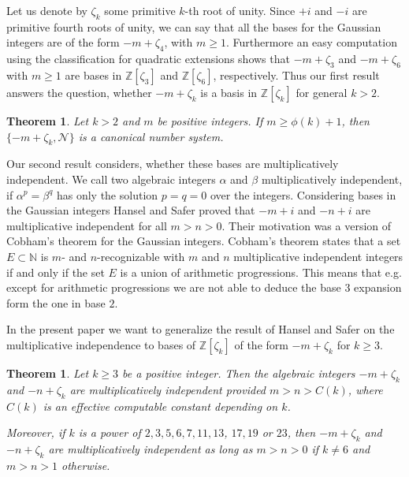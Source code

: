 \documentclass{amsart}
\theoremstyle{plain}
\numberwithin{equation}{section}
\newtheorem{theorem}[thm]{Theorem}
\theoremstyle{remark}
\begin{document}
Let us denote by $\zeta_k$ some primitive $k$-th root of unity. Since
$+i$ and $-i$ are primitive fourth roots of unity, we can say that all
the bases for the Gaussian integers are of the form $-m+\zeta_4$, with
$m\geq 1$. Furthermore an easy computation using the classification
for quadratic extensions shows that $-m+\zeta_3$ and $-m+\zeta_6$ with
$m\geq1$ are bases in ${{\mathbb Z}}[\zeta_3]$ and ${{\mathbb Z}}[\zeta_6]$,
respectively. Thus our first result answers the question, whether
$-m+\zeta_k$ is a basis in ${{\mathbb Z}}[\zeta_k]$ for general $k>2$.

\begin{theorem}\label{th:bases}
  Let $k>2$ and $m$ be positive integers. If $m\geq\phi(k)+1$, then
  $\{-m+\zeta_k,\mathcal{N}\}$ is a canonical number system.
\end{theorem}

Our second result considers, whether these bases are multiplicatively
independent. We call two algebraic integers $\alpha$ and $\beta$
multiplicatively independent, if $\alpha^p=\beta^q$ has only the
solution $p=q=0$ over the integers. Considering bases in the Gaussian
integers Hansel and Safer \cite{hansel_safer2003:vers_un_theoreme}
proved that $-m+i$ and $-n+i$ are multiplicative independent for all
$m>n>0$. Their motivation was a version of Cobham's theorem
\cite{cobham1972:uniform_tag_sequences} for the Gaussian
integers. Cobham's theorem states that a set $E\subset{{\mathbb N}}$ is $m$- and
$n$-recognizable with $m$ and $n$ multiplicative independent integers
if and only if the set $E$ is a union of arithmetic progressions. This
means that e.g. except for arithmetic progressions we are not able to
deduce the base $3$ expansion form the one in base $2$.

In the present paper we want to generalize the result of Hansel and
Safer \cite{hansel_safer2003:vers_un_theoreme} on the multiplicative
independence to bases of ${{\mathbb Z}}[\zeta_k]$ of the form $-m+\zeta_k$ for
$k\geq3$.

\begin{theorem}\label{th:mult_independent}
  Let $k\geq3$ be a positive integer. Then the algebraic integers
  $-m+\zeta_k$ and $-n+\zeta_k$ are multiplicatively independent
  provided $m>n>C(k)$, where $C(k)$ is an effective computable
  constant depending on $k$.

  Moreover, if $k$ is a power of $2,3,5,6,7,11,13$, $17,19$ or $23$,
  then $-m+\zeta_k$ and $-n+\zeta_k$ are multiplicatively independent
  as long as $m>n>0$ if $k\neq 6$ and $m>n>1$ otherwise.
\end{theorem}
\end{document}
